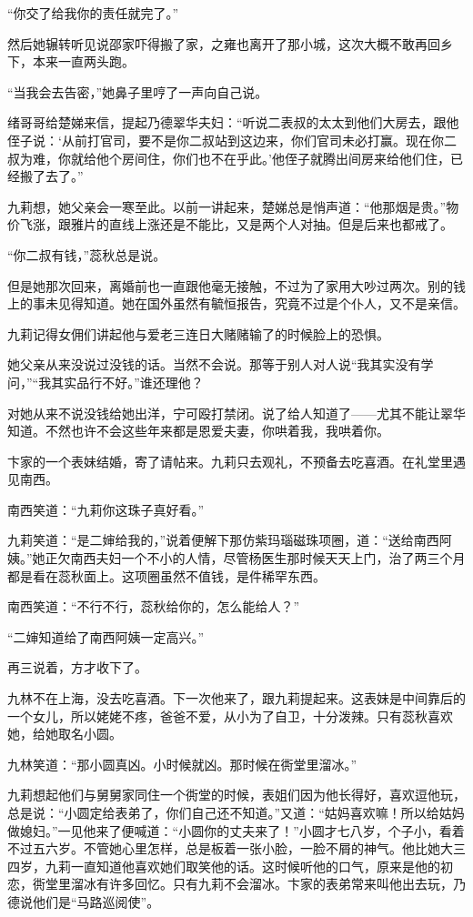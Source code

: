 \par “你交了给我你的责任就完了。”
\par 然后她辗转听见说邵家吓得搬了家，之雍也离开了那小城，这次大概不敢再回乡下，本来一直两头跑。
\par “当我会去告密，”她鼻子里哼了一声向自己说。
\par 绪哥哥给楚娣来信，提起乃德翠华夫妇：“听说二表叔的太太到他们大房去，跟他侄子说：‘从前打官司，要不是你二叔站到这边来，你们官司未必打赢。现在你二叔为难，你就给他个房间住，你们也不在乎此。’他侄子就腾出间房来给他们住，已经搬了去了。”
\par 九莉想，她父亲会一寒至此。以前一讲起来，楚娣总是悄声道：“他那烟是贵。”物价飞涨，跟雅片的直线上涨还是不能比，又是两个人对抽。但是后来也都戒了。
\par “你二叔有钱，”蕊秋总是说。
\par 但是她那次回来，离婚前也一直跟他毫无接触，不过为了家用大吵过两次。别的钱上的事未见得知道。她在国外虽然有毓恒报告，究竟不过是个仆人，又不是亲信。
\par 九莉记得女佣们讲起他与爱老三连日大赌赌输了的时候脸上的恐惧。
\par 她父亲从来没说过没钱的话。当然不会说。那等于别人对人说“我其实没有学问，”“我其实品行不好。”谁还理他？
\par 对她从来不说没钱给她出洋，宁可殴打禁闭。说了给人知道了——尤其不能让翠华知道。不然也许不会这些年来都是恩爱夫妻，你哄着我，我哄着你。
\par 卞家的一个表妹结婚，寄了请帖来。九莉只去观礼，不预备去吃喜酒。在礼堂里遇见南西。
\par 南西笑道：“九莉你这珠子真好看。”
\par 九莉笑道：“是二婶给我的，”说着便解下那仿紫玛瑙磁珠项圈，道：“送给南西阿姨。”她正欠南西夫妇一个不小的人情，尽管杨医生那时候天天上门，治了两三个月都是看在蕊秋面上。这项圈虽然不值钱，是件稀罕东西。
\par 南西笑道：“不行不行，蕊秋给你的，怎么能给人？”
\par “二婶知道给了南西阿姨一定高兴。”
\par 再三说着，方才收下了。
\par 九林不在上海，没去吃喜酒。下一次他来了，跟九莉提起来。这表妹是中间靠后的一个女儿，所以姥姥不疼，爸爸不爱，从小为了自卫，十分泼辣。只有蕊秋喜欢她，给她取名小圆。
\par 九林笑道：“那小圆真凶。小时候就凶。那时候在衖堂里溜冰。”
\par 九莉想起他们与舅舅家同住一个衖堂的时候，表姐们因为他长得好，喜欢逗他玩，总是说：“小圆定给表弟了，你们自己还不知道。”又道：“姑妈喜欢嘛！所以给姑妈做媳妇。”一见他来了便喊道：“小圆你的丈夫来了！”小圆才七八岁，个子小，看着不过五六岁。不管她心里怎样，总是板着一张小脸，一脸不屑的神气。他比她大三四岁，九莉一直知道他喜欢她们取笑他的话。这时候听他的口气，原来是他的初恋，衖堂里溜冰有许多回忆。只有九莉不会溜冰。卞家的表弟常来叫他出去玩，乃德说他们是“马路巡阅使”。
